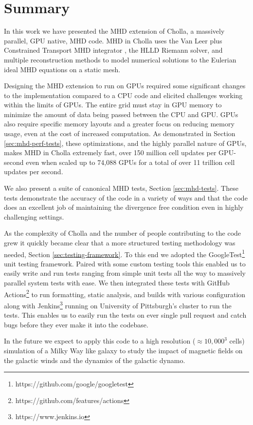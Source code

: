 \section{Summary}
\label{sec:summary}

In this work we have presented the MHD extension of Cholla, a massively parallel, GPU native, MHD code. MHD in Cholla uses the Van Leer plus Constrained Transport MHD integrator \citep{stone_2009}, the HLLD Riemann solver, and multiple reconstruction methods to model numerical solutions to the Eulerian ideal MHD equations on a static mesh.

Designing the MHD extension to run on GPUs required some significant changes to the implementation compared to a CPU code and elicited challenges working within the limits of GPUs. The entire grid must stay in GPU memory to minimize the amount of data being passed between the CPU and GPU. GPUs also require specific memory layouts and a greater focus on reducing memory usage, even at the cost of increased computation. As demonstrated in Section \ref{sec:mhd-perf-tests}, these optimizations, and the highly parallel nature of GPUs, makes MHD in Cholla extremely fast, over 150 million cell updates per GPU-second even when scaled up to 74,088 GPUs for a total of over 11 trillion cell updates per second. 

We also present a suite of canonical MHD tests, Section \ref{sec:mhd-tests}. These tests demonstrate the accuracy of the code in a variety of ways and that the code does an excellent job of maintaining the divergence free condition even in highly challenging settings. 

As the complexity of Cholla and the number of people contributing to the code grew it quickly became clear that a more structured testing methodology was needed, Section \ref{sec:testing-framework}. To this end we adopted the GoogleTest\footnote{https://github.com/google/googletest} unit testing framework. Paired with some custom testing tools this enabled us to easily write and run tests ranging from simple unit tests all the way to massively parallel system tests with ease. We then integrated these tests with GitHub Actions\footnote{https://github.com/features/actions} to run formatting, static analysis, and builds with various configuration along with Jenkins\footnote{https://www.jenkins.io} running on University of Pittsburgh's cluster to run the tests. This enables us to easily run the tests on ever single pull request and catch bugs before they ever make it into the codebase.

In the future we expect to apply this code to a high resolution ($\approx 10,000^3$ cells) simulation of a Milky Way like galaxy to study the impact of magnetic fields on the galactic winds and the dynamics of the galactic dynamo.